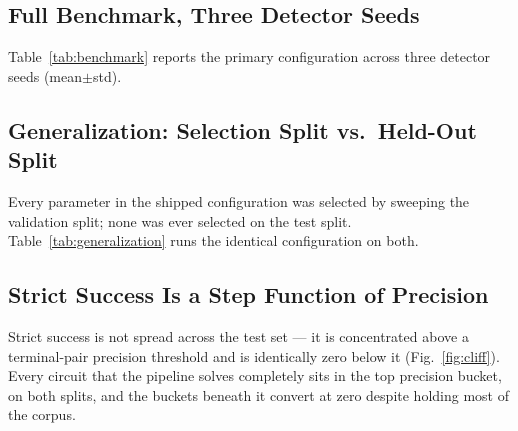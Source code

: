 \subsection{Full Benchmark, Three Detector Seeds}
Table~\ref{tab:benchmark} reports the primary configuration across
three detector seeds (mean$\pm$std).

\begin{table}[t]
  \centering
  \caption{Primary configuration, three detector training seeds.}
  \label{tab:benchmark}
  
\end{table}

\subsection{Generalization: Selection Split vs.\ Held-Out Split}
Every parameter in the shipped configuration was selected by sweeping the
validation split; none was ever selected on the test split.
Table~\ref{tab:generalization} runs the identical configuration on both.

\begin{table}[t]
  \centering
  \caption{Identical configuration on the split every parameter was tuned
  on and on the held-out split. $p$ from a two-proportion $z$-test for
  strict success and Welch's $t$ otherwise; the comparison is unpaired
  because the image sets differ.}
  \label{tab:generalization}
  
\end{table}

\subsection{Strict Success Is a Step Function of Precision}
Strict success is not spread across the test set --- it is concentrated
above a terminal-pair precision threshold and is identically zero below
it (Fig.~\ref{fig:cliff}). Every circuit that the pipeline solves
completely sits in the top precision bucket, on both splits, and the
buckets beneath it convert at zero despite holding most of the corpus.

